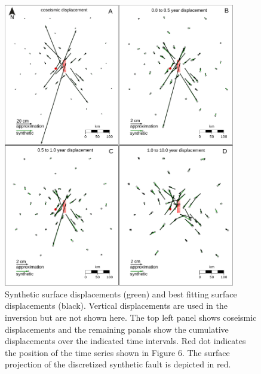 \documentclass[extra,mreferee]{gji}
\begin{document}
\begin{figure}[h!]\label{figure5}
  \centering
  \includegraphics[width=0.9\textwidth]{FinalFigures/Figure4.pdf}
  \caption{Synthetic surface displacements (green) and best fitting
    surface displacements (black).  Vertical displacements are used in
    the inversion but are not shown here.  The top left panel shows
    coseismic displacements and the remaining panals show the
    cumulative displacements over the indicated time intervals. Red dot indicates
    the position of the time series shown in Figure 6. The surface
    projection of the discretized synthetic fault is depicted in red.}
  \label{Figure 5}
\end{figure}
\end{document}
